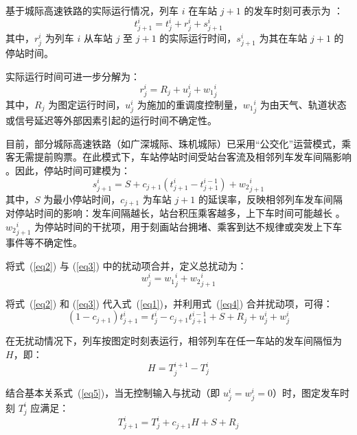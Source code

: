 基于城际高速铁路的实际运行情况，列车 $i$ 在车站 $j+1$ 的发车时刻可表示为 \cite{VanBreusegem1991}：
\begin{equation}
   t_{j+1}^{i}=t_{j}^{i}+r_{j}^{i}+s_{j+1}^{i} 
\label{eq1}
\end{equation}
其中，$r_{j}^{i}$ 为列车 $i$ 从车站 $j$ 至 $j+1$ 的实际运行时间，$s_{j+1}^{i}$ 为其在车站 $j+1$ 的停站时间。

实际运行时间可进一步分解为：
\begin{equation}
   r_{j}^{i}=R_{j}+u_{j}^{i}+{w_1}_{j}^{i}
\label{eq2}
\end{equation}
其中，$R_{j}$ 为图定运行时间，$u_{j}^{i}$ 为施加的重调度控制量，${w_1}_{j}^{i}$ 为由天气、轨道状态或信号延迟等外部因素引起的运行时间不确定性。

目前，部分城际高速铁路（如广深城际、珠机城际）已采用“公交化”运营模式，乘客无需提前购票。在此模式下，车站停站时间受站台客流及相邻列车发车间隔影响 \cite{Kang2024}。因此，停站时间可建模为：
\begin{equation}
    s_{j+1}^{i}=S+c_{j+1} (t_{j+1}^{i}-t_{j+1}^{i-1})+{w_2}_{j+1}^{i}
\label{eq3}
\end{equation}
其中，$S$ 为最小停站时间，$c_{j+1}$ 为车站 $j+1$ 的延误率，反映相邻列车发车间隔对停站时间的影响：发车间隔越长，站台积压乘客越多，上下车时间可能越长 \cite{Li2016a, VanBreusegem1991}。${w_2}_{j+1}^{i}$ 为停站时间的干扰项，用于刻画站台拥堵、乘客到达不规律或突发上下车事件等不确定性。

将式~(\ref{eq2}) 与 (\ref{eq3}) 中的扰动项合并，定义总扰动为：
\begin{equation}
    w_{j}^{i}={w_1}_{j}^{i}+{w_2}_{j+1}^{i}
\label{eq4}
\end{equation}

将式~(\ref{eq2}) 和 (\ref{eq3}) 代入式~(\ref{eq1})，并利用式~(\ref{eq4}) 合并扰动项，可得：
\begin{equation}
    (1-c_{j+1})t_{j+1}^{i}=t_{j}^{i}-c_{j+1}t_{j+1}^{i-1}+S+R_{j}+u_{j}^{i}+w_{j}^{i}
\label{eq5}
\end{equation}

在无扰动情况下，列车按图定时刻表运行，相邻列车在任一车站的发车间隔恒为 $H$，即：
\begin{equation}
	H=T_{j}^{i+1}- T_{j}^{i}
\label{eq6}
\end{equation}

结合基本关系式~(\ref{eq5})，当无控制输入与扰动（即 $u_{j}^{i}=w_{j}^{i}=0$）时，图定发车时刻 $T_{j}^{i}$ 应满足：
\begin{equation}
    T_{j+1}^{i}=T_{j}^{i}+c_{j+1}H+S+R_{j}
\label{eq7}
\end{equation}

